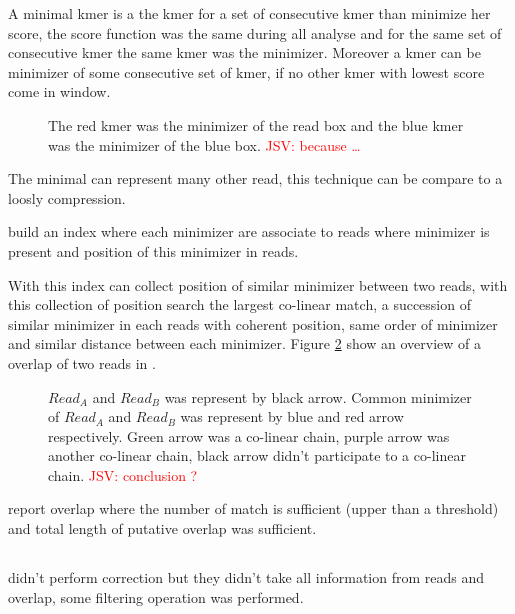 \documentclass[main]{subfiles}
\begin{document}
A minimal kmer is a the kmer for a set of consecutive kmer than minimize her score, the score function was the same during all analyse and for the same set of consecutive kmer the same kmer was the minimizer. Moreover a kmer can be minimizer of some consecutive set of kmer, if no other kmer with lowest score come in window. 

\begin{figure}[ht]
    \centering
    
    \caption{The red kmer was the minimizer of the read box and the blue kmer was the minimizer of the blue box. \textcolor{red}{JSV: because \dots}}
    \label{sota:fig:miniasm:minimizer}
\end{figure}

The minimal \kmer can represent many other read, this technique can be compare to a loosly compression. 

\minimap build an index where each minimizer are associate to reads where minimizer is present and position of this minimizer in reads.

With this index \minimap can collect position of similar minimizer between two reads, with this collection of position \minimap search the largest co-linear match, a succession of similar minimizer in each reads with coherent position, same order of minimizer and similar distance between each minimizer. Figure \ref{sota:fig:miniasm:mapping} show an overview of a overlap of two reads in \minimap.

\begin{figure}[ht]
    \centering
    
    \caption{$Read_A$ and $Read_B$ was represent by black arrow. Common minimizer of $Read_A$ and $Read_B$ was represent by blue and red arrow respectively. Green arrow was a co-linear chain, purple arrow was another co-linear chain, black arrow didn't participate to a co-linear chain. \textcolor{red}{JSV: conclusion ?}}
    \label{sota:fig:miniasm:mapping}
\end{figure}

\minimap report overlap where the number of match is sufficient (upper than a threshold) and  total length of putative overlap was sufficient. 

\subsection{\miniasm}

\miniasm didn't perform correction but they didn't take all information from reads and overlap, some filtering operation was performed.
\end{document}
